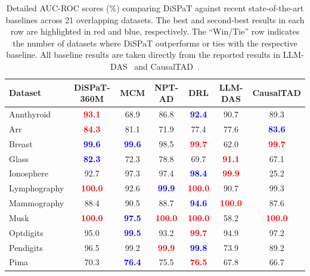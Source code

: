 \begin{table}[t]
\centering
\caption{Detailed AUC-ROC scores (\%) comparing DiSPaT against recent state-of-the-art baselines across 21 overlapping datasets. The best and second-best results in each row are highlighted in red and blue, respectively. The ``Win/Tie'' row indicates the number of datasets where DiSPaT outperforms or ties with the respective baseline. All baseline results are taken directly from the reported results in LLM-DAS~\citep{ye2026llmdas} and CausalTAD~\citep{wang2026causaltad}.}
\label{tab:recent_baselines}
\small
\renewcommand{\arraystretch}{1.08}
\begin{tabular*}{\textwidth}{@{\extracolsep{\fill}}lcccccc@{}}
\toprule
\textbf{Dataset} & \textbf{DiSPaT-360M} & \textbf{MCM} & \textbf{NPT-AD} & \textbf{DRL} & \textbf{LLM-DAS} & \textbf{CausalTAD} \\
\midrule
Annthyroid & \textcolor{red}{\textbf{93.1}} & 68.9 & 86.8 & \textcolor{blue}{\textbf{92.4}} & 90.7 & 89.3 \\
Arr & \textcolor{red}{\textbf{84.3}} & 81.1 & 71.9 & 77.4 & 77.6 & \textcolor{blue}{\textbf{83.6}} \\
Breast & \textcolor{blue}{\textbf{99.6}} & \textcolor{blue}{\textbf{99.6}} & 98.5 & \textcolor{red}{\textbf{99.7}} & 62.0 & \textcolor{red}{\textbf{99.7}} \\
Glass & \textcolor{blue}{\textbf{82.3}} & 72.3 & 78.8 & 69.7 & \textcolor{red}{\textbf{91.1}} & 67.1 \\
Ionosphere & 92.7 & 97.3 & 97.4 & \textcolor{blue}{\textbf{98.4}} & \textcolor{red}{\textbf{99.9}} & 25.2 \\
Lymphography & \textcolor{red}{\textbf{100.0}} & 92.6 & \textcolor{blue}{\textbf{99.9}} & \textcolor{red}{\textbf{100.0}} & 90.7 & 99.3 \\
Mammography & 88.4 & 90.5 & 88.7 & \textcolor{blue}{\textbf{94.6}} & \textcolor{red}{\textbf{100.0}} & 87.6 \\
Musk & \textcolor{red}{\textbf{100.0}} & \textcolor{blue}{\textbf{97.5}} & \textcolor{red}{\textbf{100.0}} & \textcolor{red}{\textbf{100.0}} & 58.2 & \textcolor{red}{\textbf{100.0}} \\
Optdigits & 95.0 & \textcolor{blue}{\textbf{99.5}} & 93.2 & \textcolor{red}{\textbf{99.7}} & 94.9 & 97.2 \\
Pendigits & 96.5 & 99.2 & \textcolor{red}{\textbf{99.9}} & \textcolor{blue}{\textbf{99.8}} & 73.9 & 89.2 \\
Pima & 70.3 & \textcolor{blue}{\textbf{76.4}} & 75.5 & \textcolor{red}{\textbf{76.5}} & 67.8 & 66.7 \\

\end{tabular*}
\end{table}
